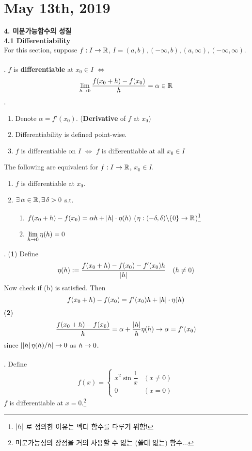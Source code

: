 \section*{May 13th, 2019}
\textbf{\large 4. 미분가능함수의 성질}\\
\textbf{4.1 Differentiability}\\
For this section, suppose $f: I \rightarrow \mathbb{R}$, $I = (a, b), (-\infty, b), (a, \infty), (-\infty,\infty )$.\\
\\
. $f$ is \textbf{differentiable} at $x_0 \in I$ $\iff$ $$\lim_{h\rightarrow 0} \frac{f(x_0 + h) - f(x_0)}{h} = \alpha \in \mathbb{R}$$
\rmk.
\begin{enumerate}
	\item Denote $\alpha = f'(x_0)$. (\textbf{Derivative} of $f$ at $x_0$)
	\item Differentiability is defined point-wise.
	\item $f$ is differentiable on $I$ $\iff$ $f$ is differentiable at all $x_0\in I$
\end{enumerate}
 The following are equivalent for $f:I\rightarrow \mathbb{R}$, $x_0\in I$.
\begin{enumerate}
	\item $f$ is differentiable at $x_0$.
	\item $\exists\,\alpha\in \mathbb{R}, \exists\,\delta > 0$ s.t.
	\begin{enumerate}
		\item $f(x_0+h) - f(x_0) = \alpha h + \left|h\right|\cdot \eta(h)$ ($\eta: (-\delta, \delta) \backslash \{0\} \rightarrow \mathbb{R}$)\footnote{$\left|h\right|$ 로 정의한 이유는 벡터 함수를 다루기 위함!}
		\item $\displaystyle \lim_{h\rightarrow 0} \eta(h) = 0$
	\end{enumerate}
\end{enumerate}
\pf. (\textbf{1}) Define $$\eta(h) := \frac{f(x_0+h)-f(x_0) - f'(x_0)h}{\left|h\right|} \quad (h\neq 0)$$
Now check if (b) is satisfied. Then
$$f(x_0+h) - f(x_0) = f'(x_0) h + \left|h\right|\cdot \eta(h)$$
(\textbf{2}) $$\frac{f(x_0+h)-f(x_0)}{h} =\alpha + \frac{\left|h\right|}{h} \eta(h) \rightarrow \alpha = f'(x_0)$$
since $\left|\left|h\right| \eta(h)/h\right|\rightarrow 0$ as $h\rightarrow 0$.\\
\\
\ex. Define $$f(x) = \begin{cases}
	x^2\sin\dfrac{1}{x} & (x \neq 0)\\
	0 & (x= 0)
\end{cases}$$
$f$ is differentiable at $x = 0$.\footnote{미분가능성의 장점을 거의 사용할 수 없는 (쓸데 없는) 함수...}\\
